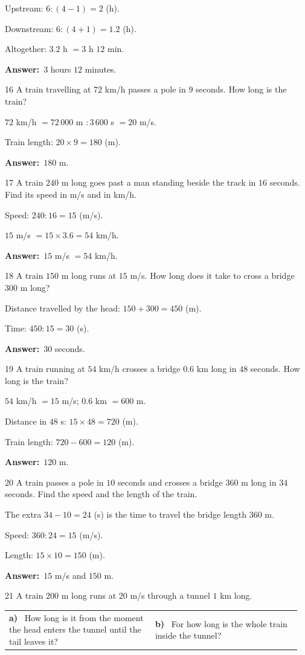 \documentclass[11pt]{article}
\makeatletter
\newif\ifsol \solfalse
\renewcommand{\arraystretch}{1.35}
\providecommand{\AnsWord}{Đáp số}
\newcommand{\dapso}[1]{\par\textbf{\AnsWord:}\ #1}
\newcommand{\probsol}[1]{%
  \begin{lrbox}{\solmeasure}\begin{minipage}{\dimexpr\linewidth-24pt\relax}#1\end{minipage}\end{lrbox}%
  \ifsol
    \begin{solbox}#1\end{solbox}%
  \else
    \setlength{\solht}{\dimexpr\ht\solmeasure+\dp\solmeasure+0.85cm\relax}%
    \ifdim\solht<1.35cm\setlength{\solht}{1.35cm}\fi
    \begin{tcolorbox}[colback=white,colframe=Line,boxrule=0.8pt,arc=5pt,
      left=8pt,right=8pt,top=4pt,bottom=4pt,height=\solht]{\footnotesize\color{Slate}\itshape\WorkWord}\end{tcolorbox}%
  \fi}
\newcommand{\pa}[1]{\textbf{#1)}\ }
\newenvironment{cols2}{\par\vspace{3pt}\noindent\setlength{\tabcolsep}{0pt}\renewcommand{\arraystretch}{1.3}%
  \begin{tabular}{@{}>{\raggedright\arraybackslash\rule{0pt}{4.4ex}}p{0.48\linewidth}<{\rule[-2.3ex]{0pt}{0pt}}@{\hspace{0.03\linewidth}}>{\raggedright\arraybackslash\rule{0pt}{4.4ex}}p{0.48\linewidth}<{\rule[-2.3ex]{0pt}{0pt}}@{}}}%
  {\end{tabular}\par}
\newcommand{\gap}{\vspace{0.3cm}}
\def\WorkWord{Your work:}
\def\AnsWord{Answer}
\makeatother
\begin{document}
\probsol{
Upstream: $6:(4-1)=2$ (h).\par Downstream: $6:(4+1)=1.2$ (h).\par Altogether: $3.2$ h $=3$ h $12$ min.
\dapso{$3$ hours $12$ minutes.}}
\gap
\begin{probbox}{16}{\relax}
A train travelling at $72$ km/h passes a pole in $9$ seconds. How long is the train?
\end{probbox}
\probsol{
$72$ km/h $=72\,000$ m $:3\,600$ s $=20$ m/s.\par Train length: $20\times9=180$ (m).
\dapso{$180$ m.}}
\gap
\begin{probbox}{17}{\relax}
A train $240$ m long goes past a man standing beside the track in $16$ seconds. Find its speed in m/s and in km/h.
\end{probbox}
\probsol{
Speed: $240:16=15$ (m/s).\par $15$ m/s $=15\times3.6=54$ km/h.
\dapso{$15$ m/s $=54$ km/h.}}
\gap
\begin{probbox}{18}{\relax}
A train $150$ m long runs at $15$ m/s. How long does it take to cross a bridge $300$ m long?
\end{probbox}
\probsol{
Distance travelled by the head: $150+300=450$ (m).\par Time: $450:15=30$ (s).
\dapso{$30$ seconds.}}
\gap
\begin{probbox}{19}{\relax}
A train running at $54$ km/h crosses a bridge $0.6$ km long in $48$ seconds. How long is the train?
\end{probbox}
\probsol{
$54$ km/h $=15$ m/s; $0.6$ km $=600$ m.\par Distance in $48$ s: $15\times48=720$ (m).\par Train length: $720-600=120$ (m).
\dapso{$120$ m.}}
\gap
\begin{probbox}{20}{\relax}
A train passes a pole in $10$ seconds and crosses a bridge $360$ m long in $34$ seconds. Find the speed and the length of the train.
\end{probbox}
\probsol{
The extra $34-10=24$ (s) is the time to travel the bridge length $360$ m.\par
Speed: $360:24=15$ (m/s).\par Length: $15\times10=150$ (m).
\dapso{$15$ m/s and $150$ m.}}
\gap
\begin{probbox}{21}{\relax}
A train $200$ m long runs at $20$ m/s through a tunnel $1$ km long.
\begin{cols2}
\pa{a} How long is it from the moment the head enters the tunnel until the tail leaves it? & \pa{b} For how long is the whole train inside the tunnel?
\end{cols2}
\end{probbox}
\end{document}
